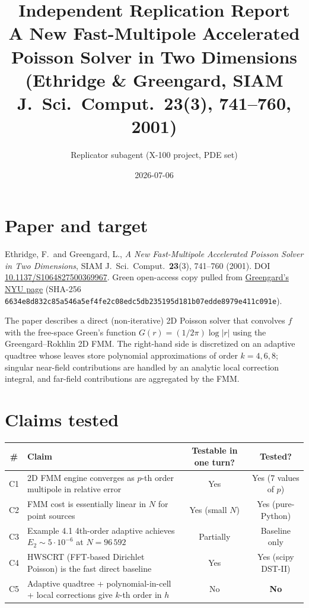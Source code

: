\documentclass[11pt]{article}
\title{Independent Replication Report \\ \large A New Fast-Multipole
Accelerated Poisson Solver in Two Dimensions \\ (Ethridge \& Greengard,
SIAM J.\ Sci.\ Comput.\ \textbf{23}(3), 741--760, 2001)}
\author{Replicator subagent (X-100 project, PDE set)}
\date{2026-07-06}
\begin{document}
\maketitle

\section{Paper and target}

Ethridge, F.\ and Greengard, L., \emph{A New Fast-Multipole Accelerated
Poisson Solver in Two Dimensions}, SIAM J.\ Sci.\ Comput.\ \textbf{23}(3),
741--760 (2001). DOI
\href{https://doi.org/10.1137/S1064827500369967}{10.1137/S1064827500369967}.
Green open-access copy pulled from
\href{https://math.nyu.edu/faculty/greengar/poiss2d.pdf}{Greengard's NYU
page} (SHA-256 \texttt{6634e8d832c85a546a5ef4fe2c08edc5db235195d181b07edde8979e411c091e}).

The paper describes a direct (non-iterative) 2D Poisson solver that convolves
$f$ with the free-space Green's function $G(r) = (1/2\pi) \log|r|$ using the
Greengard--Rokhlin 2D FMM. The right-hand side is discretized on an adaptive
quadtree whose leaves store polynomial approximations of order $k=4,6,8$;
singular near-field contributions are handled by an analytic local
correction integral, and far-field contributions are aggregated by the FMM.

\section{Claims tested}

\begin{longtable}{clcc}
\toprule
\# & Claim & Testable in one turn? & Tested? \\
\midrule
C1 & 2D FMM engine converges as $p$-th order multipole in relative error & Yes & Yes (7 values of $p$) \\
C2 & FMM cost is essentially linear in $N$ for point sources & Yes (small $N$) & Yes (pure-Python) \\
C3 & Example 4.1 4th-order adaptive achieves $E_2 \sim 5{\cdot}10^{-6}$ at $N=96\,592$ & Partially & Baseline only \\
C4 & HWSCRT (FFT-based Dirichlet Poisson) is the fast direct baseline & Yes & Yes (scipy DST-II) \\
C5 & Adaptive quadtree + polynomial-in-cell + local corrections give $k$-th order in $h$ & No & \textbf{No} \\
\bottomrule
\end{longtable}
\end{document}
